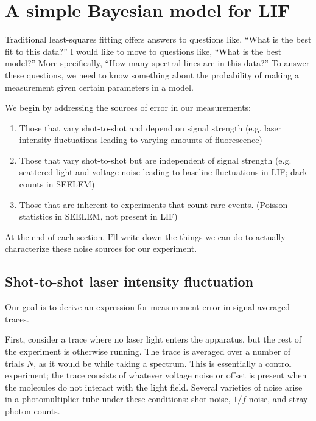 \documentclass[12pt]{article}
\begin{document}
\section{A simple Bayesian model for LIF}


Traditional least-squares fitting offers answers to questions like,
``What is the best fit to this data?''  I would like to move to
questions like, ``What is the best model?''  More specifically, ``How
many spectral lines are in this data?''  To answer these questions, we
need to know something about the probability of making a measurement
given certain parameters in a model.

We begin by addressing the sources of error in our measurements:
\begin{enumerate}
\item Those that vary shot-to-shot and depend on signal strength (e.g.
  laser intensity fluctuations leading to varying amounts of
  fluorescence)

\item Those that vary shot-to-shot but are independent of signal
  strength (e.g. scattered light and voltage noise leading to baseline
  fluctuations in LIF; dark counts in SEELEM)

\item Those that are inherent to experiments that count rare events.
  (Poisson statistics in SEELEM, not present in LIF)
\end{enumerate}
At the end of each section, I'll write down the things we can do to
actually characterize these noise sources for our experiment.

\subsection{Shot-to-shot laser intensity fluctuation}

Our goal is to derive an expression for measurement error in
signal-averaged traces. 

First, consider a trace where no laser light enters the apparatus, but
the rest of the experiment is otherwise running.  The trace is
averaged over a number of trials $N$, as it would be while taking a
spectrum.  This is essentially a control experiment; the trace
consists of whatever voltage noise or offset is present when the
molecules do not interact with the light field.  Several varieties of
noise arise in a photomultiplier tube under these conditions: shot
noise, $1/f$ noise, and stray photon counts.
\end{document}
